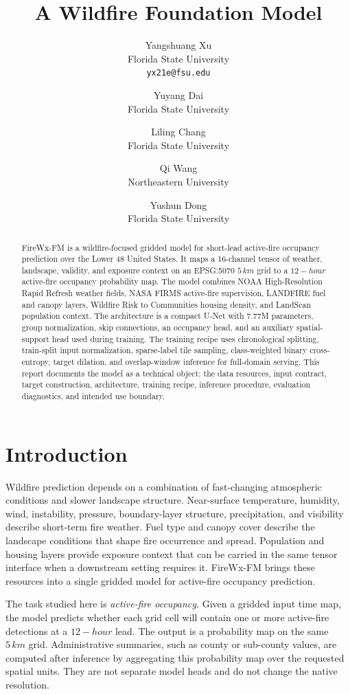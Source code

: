 \documentclass[11pt]{article}
\title{\textbf{A Wildfire Foundation Model}}
\author{
  Yangshuang Xu \\
  Florida State University \\
  \texttt{yx21e@fsu.edu}
  \and
  Yuyang Dai \\
  Florida State University
  \and
  Liling Chang \\
  Florida State University
  \and
  Qi Wang \\
  Northeastern University
  \and
  Yushun Dong \\
  Florida State University
}
\date{}
\newcommand{\model}{FireWx-FM}
\newcommand{\grid}{5\,km}
\newcommand{\lead}{12-hour}
\begin{document}
\maketitle

\begin{abstract}
\model{} is a wildfire-focused gridded model for short-lead active-fire occupancy prediction over the Lower 48 United States.
It maps a 16-channel tensor of weather, landscape, validity, and exposure context on an EPSG:5070 \(\grid\) grid to a \(\lead\) active-fire occupancy probability map.
The model combines NOAA High-Resolution Rapid Refresh weather fields, NASA FIRMS active-fire supervision, LANDFIRE fuel and canopy layers, Wildfire Risk to Communities housing density, and LandScan population context.
The architecture is a compact U-Net with 7.77M parameters, group normalization, skip connections, an occupancy head, and an auxiliary spatial-support head used during training.
The training recipe uses chronological splitting, train-split input normalization, sparse-label tile sampling, class-weighted binary cross-entropy, target dilation, and overlap-window inference for full-domain serving.
This report documents the model as a technical object: the data resources, input contract, target construction, architecture, training recipe, inference procedure, evaluation diagnostics, and intended use boundary.
\end{abstract}

\section{Introduction}

Wildfire prediction depends on a combination of fast-changing atmospheric conditions and slower landscape structure.
Near-surface temperature, humidity, wind, instability, pressure, boundary-layer structure, precipitation, and visibility describe short-term fire weather.
Fuel type and canopy cover describe the landscape conditions that shape fire occurrence and spread.
Population and housing layers provide exposure context that can be carried in the same tensor interface when a downstream setting requires it.
\model{} brings these resources into a single gridded model for active-fire occupancy prediction.

The task studied here is \emph{active-fire occupancy}.
Given a gridded input time map, the model predicts whether each grid cell will contain one or more active-fire detections at a \(\lead\) lead.
The output is a probability map on the same \(\grid\) grid.
Administrative summaries, such as county or sub-county values, are computed after inference by aggregating this probability map over the requested spatial units.
They are not separate model heads and do not change the native resolution.
\end{document}
